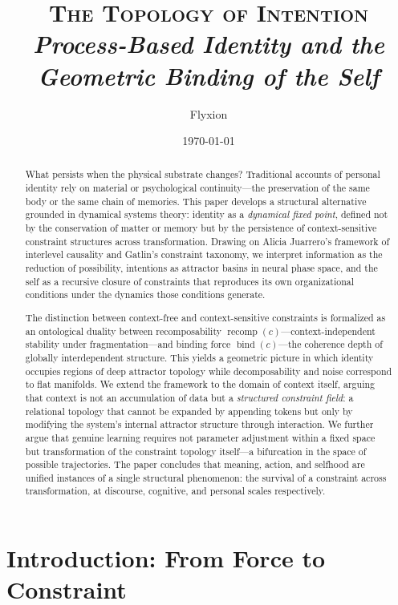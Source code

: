 \documentclass[11pt]{article}
\title{\textsc{The Topology of Intention}\\[0.4em]
{\normalsize\itshape Process-Based Identity and the Geometric Binding of the Self}}
\author{Flyxion}
\date{\today}
\newcommand{\bind}{\operatorname{bind}}
\newcommand{\recomp}{\operatorname{recomp}}
\begin{document}
\maketitle

\begin{abstract}
\noindent
What persists when the physical substrate changes? Traditional accounts of personal identity
rely on material or psychological continuity—the preservation of the same body or the same
chain of memories. This paper develops a structural alternative grounded in dynamical
systems theory: identity as a \emph{dynamical fixed point}, defined not by the conservation
of matter or memory but by the persistence of context-sensitive constraint structures across
transformation. Drawing on Alicia Juarrero's \cite{juarrero1999,juarrero2002} framework of
interlevel causality and Gatlin's \cite{gatlin1972} constraint taxonomy, we interpret
information as the reduction of possibility, intentions as attractor basins in neural phase
space, and the self as a recursive closure of constraints that reproduces its own
organizational conditions under the dynamics those conditions generate.

The distinction between context-free and context-sensitive constraints is formalized as
an ontological duality between recomposability $\recomp(c)$—context-independent stability
under fragmentation—and binding force $\bind(c)$—the coherence depth of globally
interdependent structure. This yields a geometric picture in which identity occupies
regions of deep attractor topology while decomposability and noise correspond to flat
manifolds. We extend the framework to the domain of context itself, arguing that context
is not an accumulation of data but a \emph{structured constraint field}: a relational
topology that cannot be expanded by appending tokens but only by modifying the system's
internal attractor structure through interaction. We further argue that genuine learning
requires not parameter adjustment within a fixed space but transformation of the constraint
topology itself—a bifurcation in the space of possible trajectories. The paper concludes
that meaning, action, and selfhood are unified instances of a single structural
phenomenon: the survival of a constraint across transformation, at discourse, cognitive,
and personal scales respectively.
\end{abstract}

\newpage

\section{Introduction: From Force to Constraint}
\end{document}
